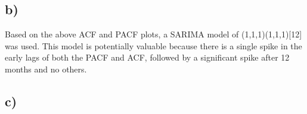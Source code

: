 \documentclass[paper=a4, fontsize=11pt]{scrartcl} %
\numberwithin{equation}{section} %
\numberwithin{figure}{section} %
\numberwithin{table}{section} %
\begin{document}

\subsection*{b)}
Based on the above ACF and PACF plots, a SARIMA model of (1,1,1)(1,1,1)[12] was used. This model is potentially valuable because there is a single spike in the early lags of both the PACF and ACF, followed by a significant spike after 12 months and no others.


\subsection*{c)}


\end{document}
